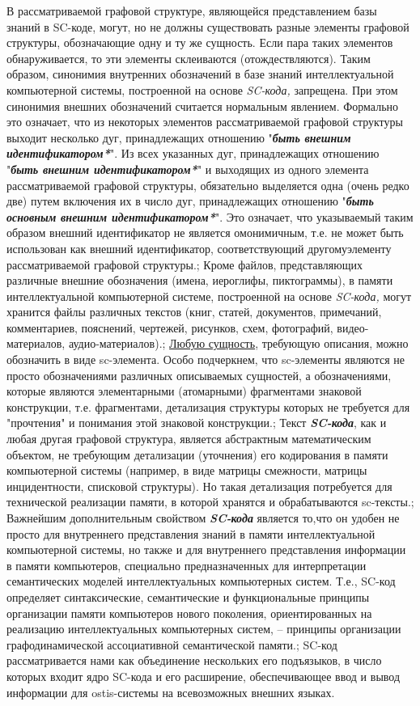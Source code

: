 \begin{SCn}
{В рассматриваемой графовой структуре, являющейся представлением базы знаний в SC-коде, могут, но не должны существовать разные элементы графовой структуры, обозначающие одну и ту же сущность. Если пара таких элементов обнаруживается, то эти элементы склеиваются (отождествляются). Таким образом, синонимия внутренних обозначений в базе знаний интеллектуальной компьютерной системы, построенной на основе \textit{SC-кода,} запрещена. При этом синонимия внешних обозначений считается нормальным явлением. Формально это означает, что из некоторых элементов рассматриваемой графовой структуры выходит несколько дуг, принадлежащих отношению "\textit{\textbf{быть внешним идентификатором*}}". Из всех указанных дуг, принадлежащих отношению "\textit{\textbf{быть внешним идентификатором*}}" и выходящих из одного элемента рассматриваемой графовой структуры, обязательно выделяется одна (очень редко две) путем включения их в число дуг, принадлежащих отношению "\textit{\textbf{быть основным внешним идентификатором*}}". Это означает, что указываемый таким образом внешний идентификатор не является омонимичным, т.е. не может быть использован как внешний идентификатор, соответствующий другомуэлементу рассматриваемой графовой структуры.;
Кроме файлов, представляющих различные внешние обозначения (имена, иероглифы, пиктограммы), в памяти интеллектуальной компьютерной системе, построенной на основе \textit{SC-кода,} могут хранится файлы различных текстов (книг, статей, документов, примечаний, комментариев, пояснений, чертежей, рисунков, схем, фотографий, видео-материалов, аудио-материалов).;
\uline{Любую сущность}, требующую описания, можно обозначить в виде sc-элемента. Особо подчеркнем, что sc-элементы являются не просто обозначениями различных описываемых сущностей, а обозначениями, которые являются элементарными (атомарными) фрагментами знаковой конструкции, т.е. фрагментами, детализация структуры которых не требуется для "прочтения" и понимания этой знаковой конструкции.;
Текст \textit{\textbf{SC-кода}}, как и любая другая графовой структура, является абстрактным математическим объектом, не требующим детализации (уточнения) его кодирования в памяти компьютерной системы (например, в виде матрицы смежности, матрицы инцидентности, списковой структуры). Но такая детализация потребуется для технической реализации памяти, в которой хранятся и обрабатываются sc-тексты.;
Важнейшим дополнительным свойством \textit{\textbf{SC-кода}} является то,что он удобен не просто для внутреннего представления знаний в памяти интеллектуальной компьютерной системы, но также и для внутреннего представления информации в памяти компьютеров, специально предназначенных для интерпретации семантических моделей интеллектуальных компьютерных систем. Т.е., SC-код определяет синтаксические, семантические и функциональные принципы организации памяти компьютеров нового поколения, ориентированных на реализацию интеллектуальных компьютерных систем, -- принципы организации графодинамической ассоциативной семантической памяти.;
SC-код рассматривается нами как объединение нескольких его подъязыков, в число которых входит ядро SC-кода и его расширение, обеспечивающее ввод и вывод информации для ostis-системы на всевозможных внешних языках.
}
\filemodefalse


\end{SCn}
